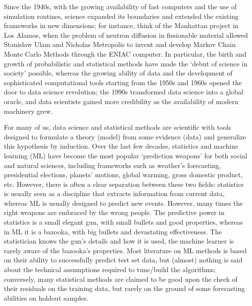 \documentclass{statsoc}
\begin{document}
Since the 1940s, with the growing availability of fast computers and the use of simulation routines, science expanded its boundaries and extended the existing frameworks in new dimensions; for instance, think of the Manhattan project in Los Alamos, when the problem of neutron diffusion in fissionable material allowed Stanislaw Ulam and Nicholas Metropolis to invent and develop Markov Chain Monte Carlo Methods through the ENIAC computer. In particular, the birth 
and growth of probabilistic and statistical methods have made the `debut of science in society' possible, whereas the growing ability of data and the development of sophisticated computational 
tools starting from the 1950s and 1960s opened the door to data science revolution; the 1990s transformed  data science into a 
global oracle, and data scientists gained more credibility as the availability of  modern machinery grew.

For many of us, data science and statistical methods 
are scientific with tools designed to formulate a theory (model) from some evidence (data) and generalize this hypothesis by induction.
Over the last few decades, statistics and machine learning (ML) have become the most popular `prediction weapons' for both social and natural sciences, including frameworks such as weather's forecasting, presidential elections, planets' motions, global warming, gross domestic product, etc. However, there is often a clear separation between these two fields: statistics is usually seen as a discipline that extracts information from  current data, whereas ML is usually designed to predict new events.  However, many times the right weapons are embraced by the wrong people. The predictive power in statistics is a small elegant 
gun, with small bullets and good properties, whereas in ML it is a bazooka, with  big bullets and devastating effectiveness. The statistician knows the gun's details and how it is used, the machine learner is rarely aware of the bazooka's properties. Most literature on ML methods \citep{breiman2001statistical} is based on their ability to successfully predict test set 
data, but (almost) nothing is said about the technical assumptions required to tune/build the algorithms; conversely, many statistical methods are claimed to be good upon the check of 
their residuals on the training data, but rarely on the ground of some forecasting abilities on holdout samples.
 
\end{document}

